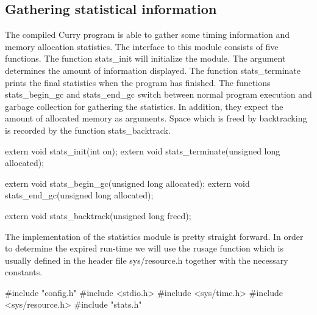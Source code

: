 %
%
\subsection{Gathering statistical information}
The compiled Curry program is able to gather some timing information
and memory allocation statistics. The interface to this module
consists of five functions. The function {\Tt{}stats{\_}init\nwendquote} will
initialize the module. The argument determines the amount of
information displayed. The function {\Tt{}stats{\_}terminate\nwendquote} prints the
final statistics when the program has finished. The functions
{\Tt{}stats{\_}begin{\_}gc\nwendquote} and {\Tt{}stats{\_}end{\_}gc\nwendquote} switch between normal program
execution and garbage collection for gathering the statistics. In
addition, they expect the amount of allocated memory as
arguments. Space which is freed by backtracking is recorded by the
function {\Tt{}stats{\_}backtrack\nwendquote}.

\nwenddocs{}\endmoddef\nwstartdeflinemarkup\nwenddeflinemarkup
extern void stats_init(int on);
extern void stats_terminate(unsigned long allocated);

extern void stats_begin_gc(unsigned long allocated);
extern void stats_end_gc(unsigned long allocated);

extern void stats_backtrack(unsigned long freed);

\nwendcode{}\nwdocspar
The implementation of the statistics module is pretty straight
forward. In order to determine the expired run-time we will use the
{\Tt{}rusage\nwendquote} function which is usually defined in the header file
{\Tt{}sys/resource.h\nwendquote} together with the necessary constants.

\nwenddocs{}\endmoddef\nwstartdeflinemarkup{}\nwenddeflinemarkup
#include "config.h"
#include <stdio.h>
#include <sys/time.h>
#include <sys/resource.h>
#include "stats.h"

